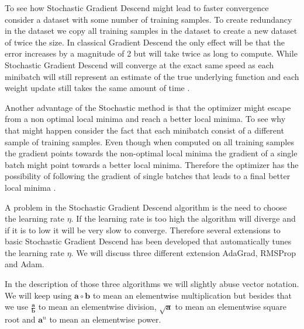 To see how Stochastic Gradient Descend might lead to faster convergence consider
a dataset with some number of training samples. To create redundancy in the
dataset we copy all training samples in the dataset to create a new dataset of
twice the size. In classical Gradient Descend the only effect will be that the
error increases by a magnitude of 2 but will take twice as long to compute.
While Stochastic Gradient Descend will converge at the exact same speed as each
minibatch will still represent an estimate of the true underlying function and
each weight update still takes the same amount of time \citep{Bishop}.

Another advantage of the Stochastic method is that the optimizer might escape
from a non optimal local minima and reach a better local minima. To see why that
might happen consider the fact that each minibatch consist of a different sample
of training samples. Even though when computed on all training samples the
gradient points towards the non-optimal local minima the gradient of a single
batch might point towards a better local minima. Therefore the optimizer has the
possibility of following the gradient of single batches that leads to a final
better local minima \citep{Bishop}.

A problem in the Stochastic Gradient Descend algorithm is the need to choose
the learning rate $\eta$. If the learning rate is too high the algorithm
will diverge and if it is to low it will be very slow to converge. Therefore
several extensions to basic Stochastic Gradient Descend has been developed that
automatically tunes the learning rate $\eta$. We will discuss three different
extension \gls{AdaGrad}, \gls{RMSProp} and \gls{Adam}.

In the description of those three algorithms we will slightly abuse vector
notation. We will keep using $\mathbf{a} \circ \mathbf{b}$ to mean an
elementwise multiplication but besides that we use
$\frac{\mathbf{a}}{\mathbf{b}}$ to mean an elementwise division,
$\sqrt{\mathbf{a}}$ to mean an elementwise square root and $\mathbf{a}^n$ to
mean an elementwise power.

